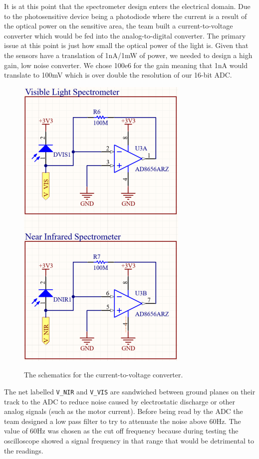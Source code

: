 \documentclass[journal]{IEEEtran}
\begin{document}
It is at this point that the spectrometer design enters the electrical domain. Due to the
photosensitive device being a photodiode where the current is a result of the optical power on the
sensitive area, the team built a current-to-voltage converter which would be fed into the
analog-to-digital converter. The primary issue at this point is just how small the optical power of
the light is. Given that the sensors have a translation of 1nA/1mW of power, we needed to design a
high gain, low noise converter. We chose 100e6 for the gain meaning that 1nA would translate to
100mV which is over double the resolution of our 16-bit ADC.
\begin{figure}[h]
	\centering
	\includegraphics[width=.9\linewidth]{images/SensorSchematics.PNG}
	\label{fig:sensor-schematic}
	\caption{The schematics for the current-to-voltage converter.}
\end{figure}
The net labelled \verb|V_NIR| and \verb|V_VIS| are sandwiched between ground planes on their track
to the ADC to reduce noise caused by electrostatic discharge or other analog signals (such as the
motor current). Before being read by the ADC the team designed a low pass filter to try to attenuate
the noise above 60Hz. The value of 60Hz was chosen as the cut off frequency because during
testing the oscilloscope showed a signal frequency in that range that would be detrimental to the
readings.
\end{document}
